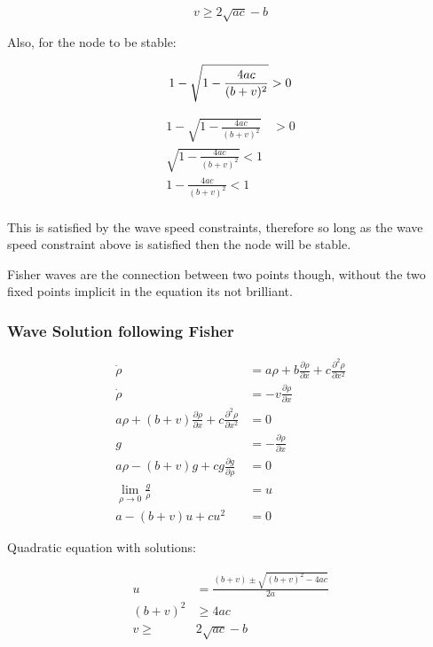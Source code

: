 \documentclass[a4paper]{article}
\begin{document}
\begin{equation}
v \geq 2 \sqrt{ac} - b
\end{equation}

Also, for the node to be stable: 

\begin{equation}
1 - \sqrt{1 - \frac{4ac}{(b+v)^2}} > 0 \\
\end{equation}

\begin{align*}
1 - \sqrt{1 - \frac{4ac}{(b+v)^2}} & > 0 \\
\sqrt{1 - \frac{4ac}{(b+v)^2}} < 1  \\
1 - \frac{4ac}{(b+v)^2} < 1 \\
\end{align*}

This is satisfied by the wave speed constraints, therefore so long as the wave speed constraint above is satisfied then the node will be stable. 

Fisher waves are the connection between two points though, without the two fixed points implicit in the equation its not brilliant. 

\subsubsection*{Wave Solution following Fisher}

\begin{align*}
\dot{\rho} & = a \rho + b \frac{\partial \rho}{\partial x} + c \frac{\partial ^2 \rho}{\partial x^2} \\
\dot{\rho} & = - v \frac{\partial \rho}{\partial x} \\
a \rho + (b+v) \frac{\partial \rho }{\partial x} + c \frac{\partial ^2 \rho }{\partial x ^2} & = 0 \\
g & = - \frac{\partial \rho}{\partial x} \\
a \rho - (b+v) g + c g \frac{\partial g}{\partial \rho} & = 0 \\
\lim _{\rho \rightarrow 0 } \frac{g}{\rho} & = u \\
a - (b + v) u + c u^2 & = 0 
\end{align*}

Quadratic equation with solutions: 

\begin{align*}
u &  = \frac{(b + v) \pm \sqrt{(b+v)^2 - 4ac}}{2a} \\
(b+v ) ^2 & \geq  4ac \\
v \geq & 2 \sqrt{ac} -b 
\end{align*}
\end{document}
